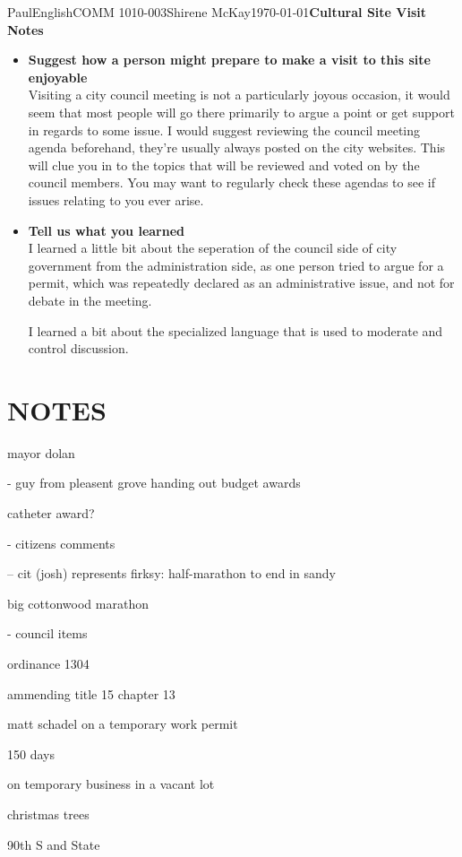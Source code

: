 \documentclass[12pt,letterpaper]{article}
\begin{document}
\begin{mla}{Paul}{English}{COMM 1010-003}{Shirene
    McKay}{\today}{\textbf{Cultural Site Visit Notes}}
\begin{itemize}
  \item \textbf{Suggest how a person might prepare to make a visit to
    this site enjoyable} \\
    Visiting a city council meeting is not a particularly joyous
    occasion, it would seem that most people will go there primarily
    to argue a point or get support in regards to some issue. I would
    suggest reviewing the council meeting agenda beforehand, they're
    usually always posted on the city websites. This will clue you in
    to the topics that will be reviewed and voted on by the council
    members. You may want to regularly check these agendas to see if
    issues relating to you ever arise.
    
  \item \textbf{Tell us what you learned} \\
    I learned a little bit about the seperation of the council side of
    city government from the administration side, as one person tried
    to argue for a permit, which was repeatedly declared as an
    administrative issue, and not for debate in the meeting.

    I learned a bit about the specialized language that is used to
    moderate and control discussion.
\end{itemize}

\section{NOTES}

mayor dolan

- guy from pleasent grove handing out budget awards

catheter award?

- citizens comments

-- cit (josh) represents firksy: half-marathon to end in sandy

big cottonwood marathon 

- council items

ordinance 1304

ammending title 15 chapter 13


matt schadel on a temporary work permit

150 days

on temporary business in a vacant lot

christmas trees

90th S and State


\end{mla}
\end{document}
